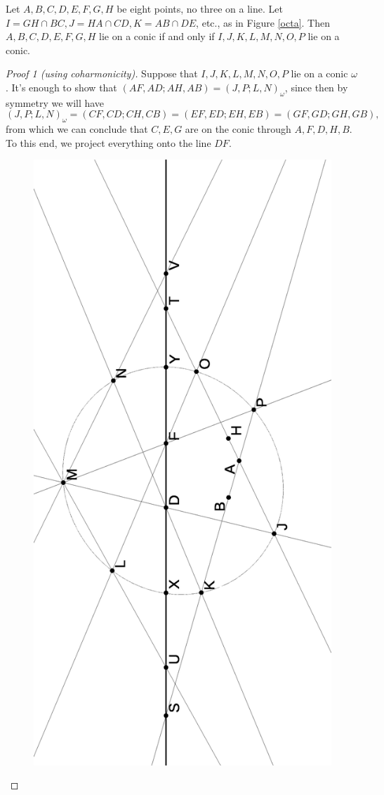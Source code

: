 \begin{thm} Let $A,B,C,D,E,F,G,H$ be eight points, no three on a line. Let $I = GH\cap BC, J = HA\cap CD, K = AB\cap DE$, etc., as in Figure \ref{octa}. Then $A,B,C,D,E,F,G,H$ lie on a conic if and only if $I,J,K,L,M,N,O,P$ lie on a conic.
\end{thm}
\begin{proof}[Proof 1 (using coharmonicity)] Suppose that $I,J,K,L,M,N,O,P$ lie on a conic $\omega$. It's enough to show that $(AF,AD;AH,AB) = (J,P;L,N)_\omega$, since then by symmetry we will have
\[
(J,P;L,N)_\omega = (CF,CD;CH,CB) = (EF,ED;EH,EB) = (GF,GD;GH,GB),
\]
from which we can conclude that $C,E,G$ are on the conic through $A,F,D,H,B$. To this end, we project everything onto the line $DF$.
\begin{figure}[!htb]
\centering
\includegraphics[scale=0.5,angle=270]{octa1.eps}

\end{figure}
\end{proof}
